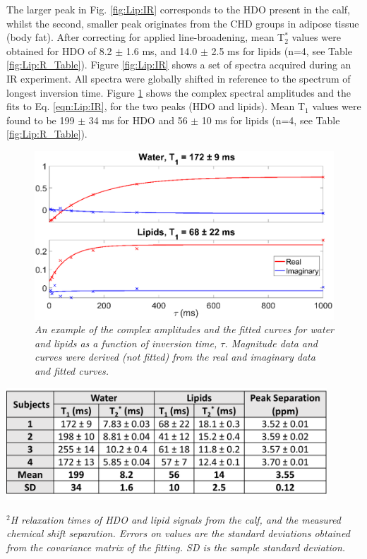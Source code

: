 The larger peak in Fig. \ref{fig:Lip:IR} corresponds to the HDO present in the calf, whilst the second, smaller peak originates from the CHD groups in adipose tissue (body fat). After correcting for applied line-broadening, mean T$_2^*$ values were obtained for \ac{HDO} of 8.2 $\pm$ 1.6 ms, and 14.0 $\pm$ 2.5 ms for lipids (n=4, see Table \ref{fig:Lip:R_Table}). Figure \ref{fig:Lip:IR} shows a set of spectra acquired during an \ac{IR} experiment. All spectra were globally shifted in reference to the spectrum of longest inversion time. Figure \ref{fig:Lip:Amp_Tau} shows the complex spectral amplitudes and the fits to Eq. \ref{eqn:Lip:IR}, for the two peaks (\ac{HDO} and lipids). Mean T$_1$ values were found to be 199 $\pm$ 34 ms for \ac{HDO} and 56 $\pm$ 10 ms for lipids (n=4, see Table \ref{fig:Lip:R_Table}).

\begin{figure}
    \centering
    \includegraphics[width=1\textwidth]{Figures/Lipid/Amp_Tau.png}
    \caption{\textit{An example of the complex amplitudes and the fitted curves for water and lipids as a function of inversion time, $\tau$. Magnitude data and curves were derived (not fitted) from the real and imaginary data and fitted curves.}}
    \label{fig:Lip:Amp_Tau}
\end{figure}

\begin{table}
    \centering
    \includegraphics[width=0.9\textwidth]{Figures/Lipid/Relaxation_Table.png}
    \caption{\textit{$^2$H relaxation times of \ac{HDO} and lipid signals from the calf, and the measured chemical shift separation. Errors on values are the standard deviations obtained from the covariance matrix of the fitting. SD is the sample standard deviation.}}
    \label{fig:Lip:R_Table}
\end{table}

